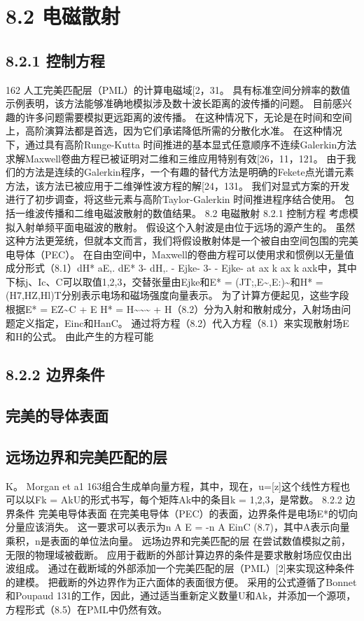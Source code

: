 \documentclass[UTF8,11pt,a4paper,openany,fontset=fandol]{ctexbook}
\begin{document}
\section{8.2 电磁散射}
\subsection{8.2.1 控制方程}
162 人工完美匹配层（PML）的计算电磁域[2，31。 具有标准空间分辨率的数值示例表明，该方法能够准确地模拟涉及数十波长距离的波传播的问题。 目前感兴趣的许多问题需要模拟更远距离的波传播。 在这种情况下，无论是在时间和空间上，高阶演算法都是首选，因为它们承诺降低所需的分散化水准。 在这种情况下，通过具有高阶Runge-Kutta 时间推进的基本显式任意顺序不连续Galerkin方法求解Maxwell卷曲方程已被证明对二维和三维应用特别有效[26，11，121。 由于我们的方法是连续的Galerkin程序，一个有趣的替代方法是明确的Fekete点光谱元素方法，该方法已被应用于二维弹性波方程的解[24，131。 我们对显式方案的开发进行了初步调查，将这些元素与高阶Taylor-Galerkin 时间推进程序结合使用。 包括一维波传播和二维电磁波散射的数值结果。 8.2 电磁散射 8.2.1 控制方程 考虑模拟入射单频平面电磁波的散射。 假设这个入射波是由位于远场的源产生的。 虽然这种方法更笼统，但就本文而言，我们将假设散射体是一个被自由空间包围的完美电导体（PEC）。 在自由空间中，Maxwell的卷曲方程可以使用求和惯例以无量值成分形式（8.1）dH* aE,. dE* 3- dH,. - Ejke- 3- - Ejke- at ax k ax k axk中，其中下标j、Ic、C可以取值1,2,3，交替张量由Ejke和E* = (JT;,E\textasciitilde{},E:)\textasciitilde{}和H* = (H7,HZ,Hl)T分别表示电场和磁场强度向量表示。 为了计算方便起见，这些字段根据E* = EZ\textasciitilde{}C + E H* = H\textasciitilde{}\textasciitilde{}\textasciitilde{} + H（8.2）分为入射和散射成分，入射场由问题定义指定，Einc和HanC。 通过将方程（8.2）代入方程（8.1）来实现散射场E和H的公式。 由此产生的方程可能

\subsection{8.2.2 边界条件}
\subsection{完美的导体表面}
\subsection{远场边界和完美匹配的层}
K。 Morgan et a1 163组合生成单向量方程，其中，现在，u=[z]这个线性方程也可以以Fk = AkU的形式书写，每个矩阵Ak中的条目k = 1,2,3，是常数。 8.2.2 边界条件 完美电导体表面 在完美电导体（PEC）的表面，边界条件是电场E*的切向分量应该消失。 这一要求可以表示为n A E = -n A EinC (8.7)，其中A表示向量乘积，n是表面的单位法向量。 远场边界和完美匹配的层 在尝试数值模拟之前，无限的物理域被截断。 应用于截断的外部计算边界的条件是要求散射场应仅由出波组成。 通过在截断域的外部添加一个完美匹配的层（PML）[2]来实现这种条件的建模。 把截断的外边界作为正六面体的表面很方便。 采用的公式遵循了Bonnet和Poupaud 131的工作，因此，通过适当重新定义数量U和Ak，并添加一个源项，方程形式（8.5）在PML中仍然有效。
\end{document}
